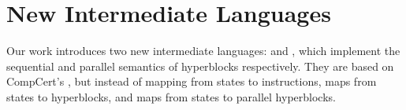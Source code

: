 


\section{New Intermediate Languages}%
\label{sec:hs:rtlblockdef}

Our work introduces two new intermediate languages: \rtlblock{} and \rtlpar{},
which implement the sequential and parallel semantics %
of
hyperblocks respectively.  They are based on CompCert's \rtl{}, but instead of
mapping from states to instructions, \rtlblock{} maps from states to
hyperblocks, and \rtlpar{} maps from states to parallel hyperblocks.

